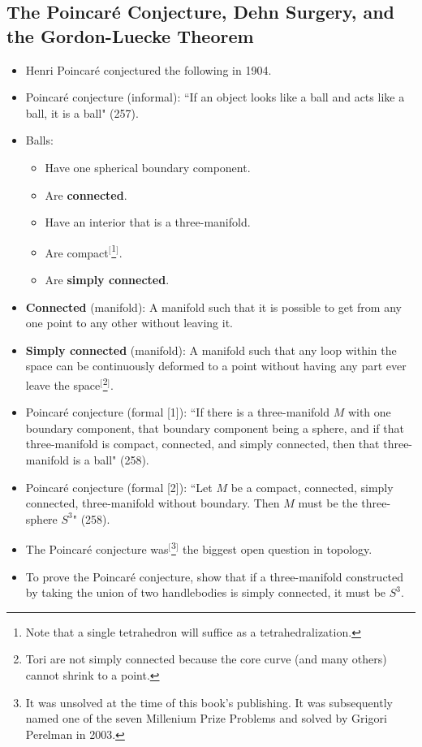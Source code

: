 \documentclass[titlepage]{article}
\numberwithin{figure}{section}
\numberwithin{table}{section}
\numberwithin{equation}{section}
\newcommand{\dq}[2]{``#1" (#2).}
\begin{document}
\subsection{The Poincar\'{e} Conjecture, Dehn Surgery, and the Gordon-Luecke Theorem}
\begin{itemize}
    \item Henri Poincar\'{e} conjectured the following in 1904.
    \item Poincar\'{e} conjecture (informal): \dq{If an object looks like a ball and acts like a ball, it is a ball}{257}
    \item Balls:
    \begin{itemize}
        \item Have one spherical boundary component.
        \item Are \textbf{connected}.
        \item Have an interior that is a three-manifold.
        \item Are compact$^[$\footnote{Note that a single tetrahedron will suffice as a tetrahedralization.}$^]$.
        \item Are \textbf{simply connected}.
    \end{itemize}
    \item \textbf{Connected} (manifold): A manifold such that it is possible to get from any one point to any other without leaving it.
    \item \textbf{Simply connected} (manifold): A manifold such that any loop within the space can be continuously deformed to a point without having any part ever leave the space$^[$\footnote{Tori are not simply connected because the core curve (and many others) cannot shrink to a point.}$^]$.
    \item Poincar\'{e} conjecture (formal [1]): \dq{If there is a three-manifold $M$ with one boundary component, that boundary component being a sphere, and if that three-manifold is compact, connected, and simply connected, then that three-manifold is a ball}{258}
    \item Poincar\'{e} conjecture (formal [2]): \dq{Let $M$ be a compact, connected, simply connected, three-manifold without boundary. Then $M$ must be the three-sphere $S^3$}{258}
    \item The Poincar\'{e} conjecture was$^[$\footnote{It was unsolved at the time of this book's publishing. It was subsequently named one of the seven Millenium Prize Problems and solved by Grigori Perelman in 2003.}$^]$ the biggest open question in topology.
    \item To prove the Poincar\'{e} conjecture, show that if a three-manifold constructed by taking the union of two handlebodies is simply connected, it must be $S^3$.

\end{itemize}
\end{document}

